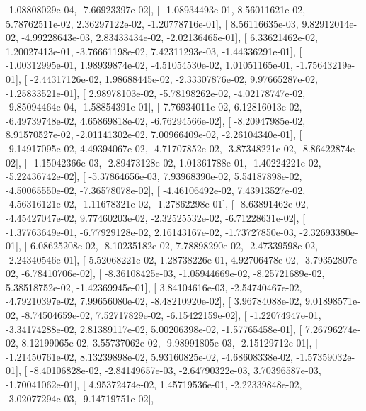 \documentclass{article}
\begin{document}
         -1.08808029e-04,  -7.66923397e-02],
       [ -1.08934493e-01,   8.56011621e-02,   5.78762511e-02,
          2.36297122e-02,  -1.20778716e-01],
       [  8.56116635e-03,   9.82912014e-02,  -4.99228643e-03,
          2.83433434e-02,  -2.02136465e-01],
       [  6.33621462e-02,   1.20027413e-01,  -3.76661198e-02,
          7.42311293e-03,  -1.44336291e-01],
       [ -1.00312995e-01,   1.98939874e-02,  -4.51054530e-02,
          1.01051165e-01,  -1.75643219e-01],
       [ -2.44317126e-02,   1.98688445e-02,  -2.33307876e-02,
          9.97665287e-02,  -1.25833521e-01],
       [  2.98978103e-02,  -5.78198262e-02,  -4.02178747e-02,
         -9.85094464e-04,  -1.58854391e-01],
       [  7.76934011e-02,   6.12816013e-02,  -6.49739748e-02,
          4.65869818e-02,  -6.76294566e-02],
       [ -8.20947985e-02,   8.91570527e-02,  -2.01141302e-02,
          7.00966409e-02,  -2.26104340e-01],
       [ -9.14917095e-02,   4.49394067e-02,  -4.71707852e-02,
         -3.87348221e-02,  -8.86422874e-02],
       [ -1.15042366e-03,  -2.89473128e-02,   1.01361788e-01,
         -1.40224221e-02,  -5.22436742e-02],
       [ -5.37864656e-03,   7.93968390e-02,   5.54187898e-02,
         -4.50065550e-02,  -7.36578078e-02],
       [ -4.46106492e-02,   7.43913527e-02,  -4.56316121e-02,
         -1.11678321e-02,  -1.27862298e-01],
       [ -8.63891462e-02,  -4.45427047e-02,   9.77460203e-02,
         -2.32525532e-02,  -6.71228631e-02],
       [ -1.37763649e-01,  -6.77929128e-02,   2.16143167e-02,
         -1.73727850e-03,  -2.32693380e-01],
       [  6.08625208e-02,  -8.10235182e-02,   7.78898290e-02,
         -2.47339598e-02,  -2.24340546e-01],
       [  5.52068221e-02,   1.28738226e-01,   4.92706478e-02,
         -3.79352807e-02,  -6.78410706e-02],
       [ -8.36108425e-03,  -1.05944669e-02,  -8.25721689e-02,
          5.38518752e-02,  -1.42369945e-01],
       [  3.84104616e-03,  -2.54740467e-02,  -4.79210397e-02,
          7.99656080e-02,  -8.48210920e-02],
       [  3.96784088e-02,   9.01898571e-02,  -8.74504659e-02,
          7.52717829e-02,  -6.15422159e-02],
       [ -1.22074947e-01,  -3.34174288e-02,   2.81389117e-02,
          5.00206398e-02,  -1.57765458e-01],
       [  7.26796274e-02,   8.12199065e-02,   3.55737062e-02,
         -9.98991805e-03,  -2.15129712e-01],
       [ -1.21450761e-02,   8.13239898e-02,   5.93160825e-02,
         -4.68608338e-02,  -1.57359032e-01],
       [ -8.40106828e-02,  -2.84149657e-03,  -2.64790322e-03,
          3.70396587e-03,  -1.70041062e-01],
       [  4.95372474e-02,   1.45719536e-01,  -2.22339848e-02,
         -3.02077294e-03,  -9.14719751e-02],
\end{document}

